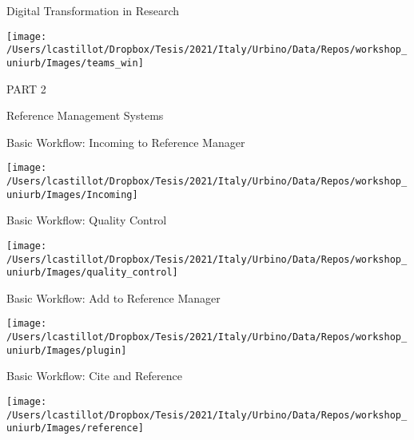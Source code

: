 \documentclass[
  ignorenonframetext,
]{beamer}
\begin{document}
\begin{frame}{Digital Transformation in Research}
\protect\hypertarget{digital-transformation-in-research}{}
\begin{center}\texttt{[image: /Users/lcastillot/Dropbox/Tesis/2021/Italy/Urbino/Data/Repos/workshop\_uniurb/Images/teams\_win]} \end{center}
\end{frame}

\begin{frame}{PART 2}
\protect\hypertarget{part-2}{}
\begin{block}{Reference Management Systems}
\protect\hypertarget{reference-management-systems}{}
\end{block}
\end{frame}

\begin{frame}{Basic Workflow: Incoming to Reference Manager}
\protect\hypertarget{basic-workflow-incoming-to-reference-manager}{}
\begin{center}\texttt{[image: /Users/lcastillot/Dropbox/Tesis/2021/Italy/Urbino/Data/Repos/workshop\_uniurb/Images/Incoming]} \end{center}
\end{frame}

\begin{frame}{Basic Workflow: Quality Control}
\protect\hypertarget{basic-workflow-quality-control}{}
\begin{center}\texttt{[image: /Users/lcastillot/Dropbox/Tesis/2021/Italy/Urbino/Data/Repos/workshop\_uniurb/Images/quality\_control]} \end{center}
\end{frame}

\begin{frame}{Basic Workflow: Add to Reference Manager}
\protect\hypertarget{basic-workflow-add-to-reference-manager}{}
\begin{center}\texttt{[image: /Users/lcastillot/Dropbox/Tesis/2021/Italy/Urbino/Data/Repos/workshop\_uniurb/Images/plugin]} \end{center}
\end{frame}

\begin{frame}{Basic Workflow: Cite and Reference}
\protect\hypertarget{basic-workflow-cite-and-reference}{}
\begin{center}\texttt{[image: /Users/lcastillot/Dropbox/Tesis/2021/Italy/Urbino/Data/Repos/workshop\_uniurb/Images/reference]} \end{center}
\end{frame}
\end{document}
